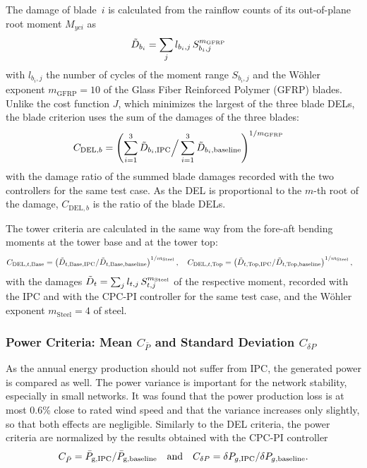 The damage of blade~$i$ is calculated from the rainflow counts of its out-of-plane root moment $M_{yci}$ as
\begin{align*}
    \Tilde{D}_{b_i} &= \sum_{j} l_{b_i,j}\, S_{b_i,j}^{m_{\text{GFRP}}}
\end{align*}
with $l_{b_i,j}$ the number of cycles of the moment range $S_{b_i,j}$ and the W\"ohler exponent $m_{\text{GFRP}} = 10$ of the Glass Fiber Reinforced Polymer (GFRP) blades. Unlike the cost function $J$, which minimizes the largest of the three blade DELs, the blade criterion uses the sum of the damages of the three blades:
\begin{align*}
    C_{\text{DEL},b} &= \left(\sum_{i=1}^{3}\Tilde{D}_{b_i,\text{IPC}} \Big/ \sum_{i=1}^{3}\Tilde{D}_{b_i,\text{baseline}}\right)^{1/m_{\text{GFRP}}}
\end{align*}
with the damage ratio of the summed blade damages recorded with the two controllers for the same test case. As the DEL is proportional to the $m$-th root of the damage, $C_{\text{DEL},b}$ is the ratio of the blade DELs.

The tower criteria are calculated in the same way from the fore-aft bending moments at the tower base and at the tower top:
\begin{align*}
    C_{\text{DEL},t,\text{Base}} &= \left(\Tilde{D}_{t,\text{Base},\text{IPC}}/\Tilde{D}_{t,\text{Base},\text{baseline}}\right)^{1/m_{\text{Steel}}}, \quad
    C_{\text{DEL},t,\text{Top}} = \left(\Tilde{D}_{t,\text{Top},\text{IPC}}/\Tilde{D}_{t,\text{Top},\text{baseline}}\right)^{1/m_{\text{Steel}}},
\end{align*}
with the damages $\Tilde{D}_{t} = \sum_{j} l_{t,j}\, S_{t,j}^{m_{\text{Steel}}}$ of the respective moment, recorded with the IPC and with the CPC-PI controller for the same test case, and the W\"ohler exponent $m_{\text{Steel}} = 4$ of steel.

\subsubsection*{Power Criteria: Mean $C_{\bar{P}}$ and Standard Deviation $C_{\delta P}$}
As the annual energy production should not suffer from IPC, the generated power is compared as well. The power variance is important for the network stability, especially in small networks. It was found that the power production loss is at most 0.6\% close to rated wind speed and that the variance increases only slightly, so that both effects are negligible. Similarly to the DEL criteria, the power criteria are normalized by the results obtained with the CPC-PI controller
\begin{align*} %
    C_{\bar{P}} =  \bar{P}_{\text{g,\text{IPC}}}/ \bar{P}_{\text{g,\text{baseline}}}  \quad\text{and}\quad C_{\delta P} =  \delta P_{g,\text{IPC}}/ \delta P_{g,\text{baseline}}.
\end{align*} 

